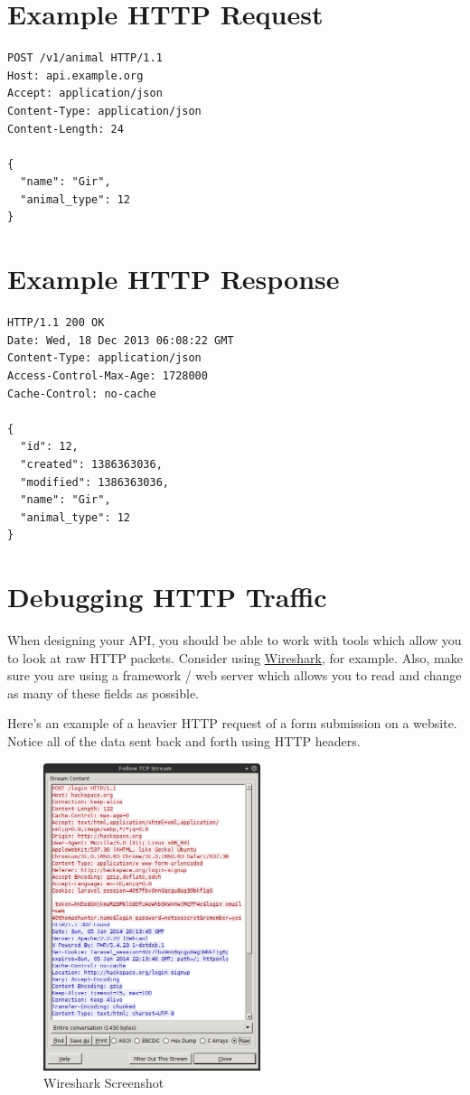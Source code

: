 \documentclass{book}
\begin{document}
\section{Example HTTP Request}

\begin{verbatim}
POST /v1/animal HTTP/1.1
Host: api.example.org
Accept: application/json
Content-Type: application/json
Content-Length: 24

{
  "name": "Gir",
  "animal_type": 12
}
\end{verbatim}

\section{Example HTTP Response}

\begin{verbatim}
HTTP/1.1 200 OK
Date: Wed, 18 Dec 2013 06:08:22 GMT
Content-Type: application/json
Access-Control-Max-Age: 1728000
Cache-Control: no-cache

{
  "id": 12,
  "created": 1386363036,
  "modified": 1386363036,
  "name": "Gir",
  "animal_type": 12
}
\end{verbatim}

\section{Debugging HTTP Traffic}

When designing your API, you should be able to work with tools which allow you to look at raw HTTP packets. Consider using \href{https://www.wireshark.org}{Wireshark}, for example. Also, make sure you are using a framework / web server which allows you to read and change as many of these fields as possible.

Here's an example of a heavier HTTP request of a form submission on a website. Notice all of the data sent back and forth using HTTP headers.

\begin{figure}[ht!]
\centering
\includegraphics[height=90mm]{images/wireshark.png}
\caption{Wireshark Screenshot}
\label{overflow}
\end{figure}
\end{document}
